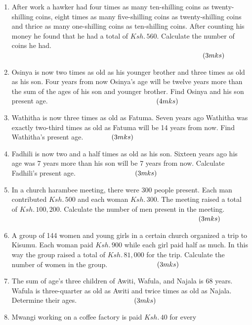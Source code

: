 \documentclass[
  a4paperpaper,
]{scrbook}
\begin{document}
\begin{tcolorbox}
\begin{enumerate}
\def\labelenumi{\arabic{enumi}.}
\setcounter{enumi}{11}
\item
  After work a hawker had four times as many ten-shilling coins as
  twenty-shilling coins, eight times as many five-shilling coins as
  twenty-shilling coins and thrice as many one-shilling coins as
  ten-shilling coins. After counting his money he found that he had a
  total of \(Ksh.\, 560\). Calculate the number of coins he had.
  \(\hspace{9.7cm} (3mks)\)
\item
  Osinya is now two times as old as his younger brother and three times
  as old as his son. Four years from now Osinya's age will be twelve
  years more than the sum of the ages of his son and younger brother.
  Find Osinya and his son present age.\(\hspace{5.5cm} (4mks)\)
\item
  Wathitha is now three times as old as Fatuma. Seven years ago Wathitha
  was exactly two-third times as old as Fatuma will be 14 years from
  now. Find Wathitha's present age. \(\hspace{1.3cm}(3mks)\)
\item
  Fadhili is now two and a half times as old as his son. Sixteen years
  ago his age was 7 years more than his son will be 7 years from now.
  Calculate Fadhili's present age. \(\hspace{2.9cm} (3mks)\)
\item
  In a church harambee meeting, there were 300 people present. Each man
  contributed \(Ksh. \,500\) and each woman \(Ksh.\, 300\). The meeting
  raised a total of \(Ksh.\, 100,200\). Calculate the number of men
  present in the meeting. \(\hspace{9.5cm} (3mks)\)
\item
  A group of 144 women and young girls in a certain church organized a
  trip to Kisumu. Each woman paid \(Ksh. \,900\) while each girl paid
  half as much. In this way the group raised a total of
  \(Ksh.\, 81,000\) for the trip. Calculate the number of women in the
  group. \(\hspace{2.4cm} (3mks)\)
\item
  The sum of age's three children of Awiti, Wafula, and Najala is 68
  years. Wafula is three-quarter as old as Awiti and twice times as old
  as Najala. Determine their ages. \(\hspace{2.8cm} (3mks)\)
\item
  Mwangi working on a coffee factory is paid \(Ksh.\, 40\) for every

\end{enumerate}
\end{tcolorbox}
\end{document}

